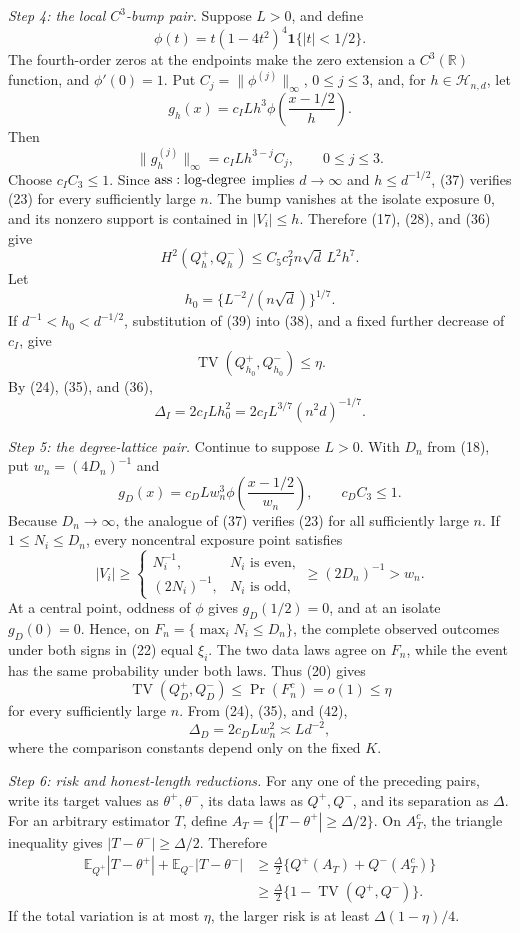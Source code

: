 \textit{Step 4: the local \(C^3\)-bump pair.}
Suppose \(L>0\), and define
\[
 \phi(t)=t(1-4t^2)^4\mathbf1\{|t|<1/2\}.
\tag{35}
\]
The fourth-order zeros at the endpoints make the zero extension a \(C^3(\mathbb R)\) function, and \(\phi'(0)=1\).  Put \(C_j=\|\phi^{(j)}\|_\infty\), \(0\leq j\leq3\), and, for \(h\in\mathcal H_{n,d}\), let
\[
 g_h(x)=c_ILh^3\phi\!\left(\frac{x-1/2}{h}\right).
\tag{36}
\]
Then
\[
 \|g_h^{(j)}\|_\infty=c_ILh^{3-j}C_j,
 \qquad 0\leq j\leq3.
\tag{37}
\]
Choose \(c_IC_3\leq1\).  Since \({\rm ass:log\text{-}degree}\) implies \(d\to\infty\) and \(h\leq d^{-1/2}\), (37) verifies (23) for every sufficiently large \(n\).  The bump vanishes at the isolate exposure \(0\), and its nonzero support is contained in \(|V_i|\leq h\).  Therefore (17), (28), and (36) give
\[
 H^2(Q_h^+,Q_h^-)
 \leq C_5c_I^2n\sqrt d\,L^2h^7.
\tag{38}
\]
Let
\[
 h_0=\{L^{-2}/(n\sqrt d)\}^{1/7}.
\tag{39}
\]
If \(d^{-1}<h_0<d^{-1/2}\), substitution of (39) into (38), and a fixed further decrease of \(c_I\), give
\[
 \operatorname{TV}(Q_{h_0}^+,Q_{h_0}^-)\leq\eta.
\tag{40}
\]
By (24), (35), and (36),
\[
 \Delta_I=2c_ILh_0^2
 =2c_IL^{3/7}(n^2d)^{-1/7}.
\tag{41}
\]

\textit{Step 5: the degree-lattice pair.}
Continue to suppose \(L>0\).  With \(D_n\) from (18), put \(w_n=(4D_n)^{-1}\) and
\[
 g_D(x)=c_DLw_n^3\phi\!\left(\frac{x-1/2}{w_n}\right),
 \qquad c_DC_3\leq1.
\tag{42}
\]
Because \(D_n\to\infty\), the analogue of (37) verifies (23) for all sufficiently large \(n\).  If \(1\leq N_i\leq D_n\), every noncentral exposure point satisfies
\[
 |V_i|\geq
 \begin{cases}N_i^{-1},&N_i\text{ is even},\\(2N_i)^{-1},&N_i\text{ is odd},\end{cases}
 \geq(2D_n)^{-1}>w_n.
\tag{43}
\]
At a central point, oddness of \(\phi\) gives \(g_D(1/2)=0\), and at an isolate \(g_D(0)=0\).  Hence, on \(F_n=\{\max_iN_i\leq D_n\}\), the complete observed outcomes under both signs in (22) equal \(\xi_i\).  The two data laws agree on \(F_n\), while the event has the same probability under both laws.  Thus (20) gives
\[
 \operatorname{TV}(Q_D^+,Q_D^-)
 \leq\Pr(F_n^c)=o(1)\leq\eta
\tag{44}
\]
for every sufficiently large \(n\).  From (24), (35), and (42),
\[
 \Delta_D=2c_DLw_n^2\asymp Ld^{-2},
\tag{45}
\]
where the comparison constants depend only on the fixed \(K\).

\textit{Step 6: risk and honest-length reductions.}
For any one of the preceding pairs, write its target values as \(\theta^+,\theta^-\), its data laws as \(Q^+,Q^-\), and its separation as \(\Delta\).  For an arbitrary estimator \(T\), define \(A_T=\{|T-\theta^+|\geq\Delta/2\}\).  On \(A_T^c\), the triangle inequality gives \(|T-\theta^-|\geq\Delta/2\).  Therefore
\[
 \begin{aligned}
 \mathbb E_{Q^+}|T-\theta^+|+\mathbb E_{Q^-}|T-\theta^-|
 &\geq\frac\Delta2\{Q^+(A_T)+Q^-(A_T^c)\}\\
 &\geq\frac\Delta2\{1-\operatorname{TV}(Q^+,Q^-)\}.
 \end{aligned}
\tag{46}
\]
If the total variation is at most \(\eta\), the larger risk is at least \(\Delta(1-\eta)/4\).


